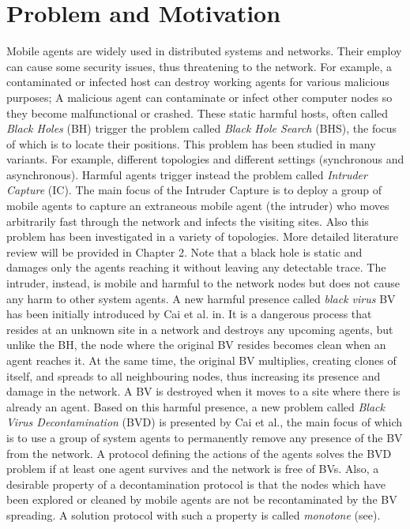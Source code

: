 \section{Problem and Motivation} 
Mobile agents are widely used in distributed systems and networks. Their employ can cause some security issues, thus threatening to the network. For example, a contaminated or infected host can destroy working agents for various malicious purposes; A malicious agent can contaminate or infect other computer nodes so they become malfunctional or crashed.
  These static  harmful hosts, often called {\em Black Holes} (BH) trigger the problem called {\em Black Hole Search} (BHS), the focus of which is to locate their positions. This problem has been studied in many variants. For example, different topologies and different settings (synchronous and asynchronous). 
  Harmful agents trigger instead the problem called {\em Intruder Capture} (IC). The main focus of the Intruder Capture  is to deploy a group of mobile agents to capture an extraneous mobile agent (the intruder) who moves arbitrarily fast through the network and infects the visiting sites. Also this problem  has been investigated in a variety of topologies. More detailed literature review will be provided in Chapter 2. Note that a black hole is static and   damages only  the agents reaching it without leaving any detectable trace. The intruder, instead,  is mobile and harmful to the network nodes but does not cause any harm to other system agents. 
    A new harmful presence called {\em black virus} BV has been initially introduced by Cai et al. in\cite{cai}. It is a dangerous process that resides at an unknown site in a network and destroys any upcoming agents, but unlike the BH, the node where the original BV resides   becomes clean when an agent reaches it. At the same time, the original BV multiplies, creating clones of itself, and spreads to all neighbouring nodes, thus increasing its presence and damage  in the network. A BV is destroyed when it moves to a site where there is already an agent. Based on this harmful presence, a new problem called {\em Black Virus Decontamination} (BVD) is presented by Cai et al., the main focus of which is to use a group of system agents to permanently remove any presence of the BV from the network. A protocol defining the actions of the agents solves the BVD problem if at least one agent survives and the network is free of BVs. Also, a desirable property of a  decontamination protocol is that the nodes which have been explored or cleaned by mobile agents are not be recontaminated by the BV spreading. A solution protocol with such a property is  called {\em monotone} (see\cite{monotone}).

